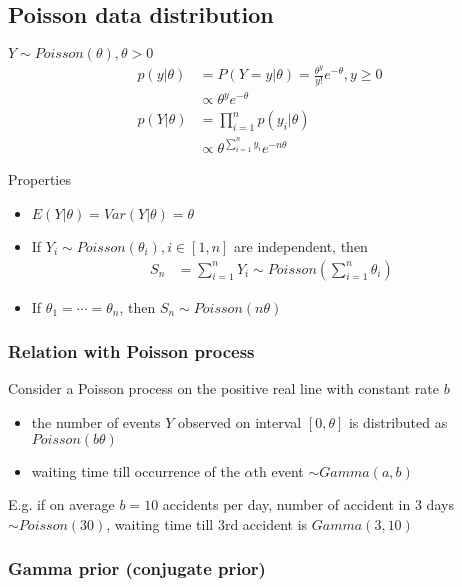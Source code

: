     \subsection{Poisson data distribution}

    $Y\sim Poisson(\theta), \theta > 0$
    \begin{align*}
        p(y|\theta) &= P(Y=y|\theta) =
        \frac{\theta^y}{y!}e^{-\theta}, y \geq 0\\
                    &\propto \theta^ye^{-\theta}\\
        p(Y|\theta) &= \prod_{i=1}^np(y_i|\theta)\\
                    &\propto \theta^{\sum_{i=1}^n y_i} e^{-n\theta}
    \end{align*}

    Properties
    \begin{itemize}
        \item $E(Y|\theta) = Var(Y|\theta) = \theta$
        \item If $Y_i \sim Poisson(\theta_i), i \in [1, n]$
            are independent, then
            \begin{align*}
                S_n &= \sum_{i=1}^n Y_i \sim
                Poisson\left(\sum_{i=1}^n\theta_i\right)
            \end{align*}
        \item If $\theta_1=\cdots = \theta_n$, then 
            $S_n\sim Poisson(n\theta)$
    \end{itemize}

    \subsubsection{Relation with Poisson process}

    Consider a Poisson process on the positive real line
    with constant rate $b$
    \begin{itemize}
        \item the number of events $Y$ observed on interval
            $[0, \theta]$ is distributed as
            $Poisson(b\theta)$
        \item waiting time till occurrence of the $\alpha$th
            event $\sim Gamma(a, b)$
    \end{itemize}

    E.g. if on average $b=10$ accidents per day, number of
    accident in 3 days $\sim Poisson(30)$, waiting time till
    3rd accident is $Gamma(3, 10)$

    \subsubsection{Gamma prior (conjugate prior)}

